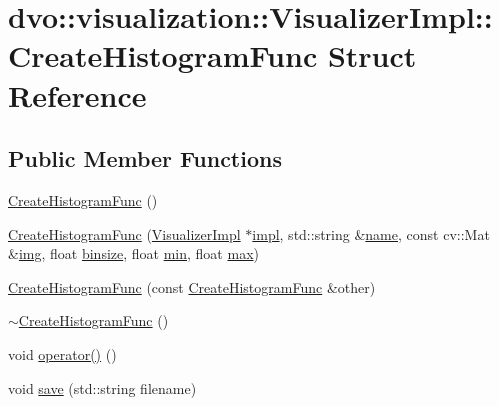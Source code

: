 \hypertarget{structdvo_1_1visualization_1_1_visualizer_impl_1_1_create_histogram_func}{}\section{dvo\+:\+:visualization\+:\+:Visualizer\+Impl\+:\+:Create\+Histogram\+Func Struct Reference}
\label{structdvo_1_1visualization_1_1_visualizer_impl_1_1_create_histogram_func}
\subsection*{Public Member Functions}
\begin{DoxyCompactItemize}
\item 
\mbox{\hyperlink{structdvo_1_1visualization_1_1_visualizer_impl_1_1_create_histogram_func_a46119b239b3abe5149e87476909c9261}{Create\+Histogram\+Func}} ()
\item 
\mbox{\hyperlink{structdvo_1_1visualization_1_1_visualizer_impl_1_1_create_histogram_func_a69be68ff5c6076f3476ded29bae27459}{Create\+Histogram\+Func}} (\mbox{\hyperlink{classdvo_1_1visualization_1_1_visualizer_impl}{Visualizer\+Impl}} $\ast$\mbox{\hyperlink{structdvo_1_1visualization_1_1_visualizer_impl_1_1_create_histogram_func_ae19bb1f928d400acb2e3fc28abfcbc1f}{impl}}, std\+::string \&\mbox{\hyperlink{structdvo_1_1visualization_1_1_visualizer_impl_1_1_create_histogram_func_a638ab4faaac71fc668bc6fb5e5c507b1}{name}}, const cv\+::\+Mat \&\mbox{\hyperlink{structdvo_1_1visualization_1_1_visualizer_impl_1_1_create_histogram_func_a7952450e28b9783d240be3c97e5fcbcf}{img}}, float \mbox{\hyperlink{structdvo_1_1visualization_1_1_visualizer_impl_1_1_create_histogram_func_a717312061e68d056ae466ff779fdbb4d}{binsize}}, float \mbox{\hyperlink{structdvo_1_1visualization_1_1_visualizer_impl_1_1_create_histogram_func_a8e2240d16aa20296dd4972aec744d3c4}{min}}, float \mbox{\hyperlink{structdvo_1_1visualization_1_1_visualizer_impl_1_1_create_histogram_func_a3065555b8878be3836e64f3b72bc2d01}{max}})
\item 
\mbox{\hyperlink{structdvo_1_1visualization_1_1_visualizer_impl_1_1_create_histogram_func_ad293baffb04f6bdd3708fa0e7f57488b}{Create\+Histogram\+Func}} (const \mbox{\hyperlink{structdvo_1_1visualization_1_1_visualizer_impl_1_1_create_histogram_func}{Create\+Histogram\+Func}} \&other)
\item 
\mbox{\hyperlink{structdvo_1_1visualization_1_1_visualizer_impl_1_1_create_histogram_func_a41c1677190f0ad86b52d904ec39c7f62}{$\sim$\+Create\+Histogram\+Func}} ()
\item 
void \mbox{\hyperlink{structdvo_1_1visualization_1_1_visualizer_impl_1_1_create_histogram_func_a51f624a7cfc68750daabaa7f72b37a58}{operator()}} ()
\item 
void \mbox{\hyperlink{structdvo_1_1visualization_1_1_visualizer_impl_1_1_create_histogram_func_a1cc5af2ecf024459deb1cd18dcd9cacc}{save}} (std\+::string filename)
\end{DoxyCompactItemize}
